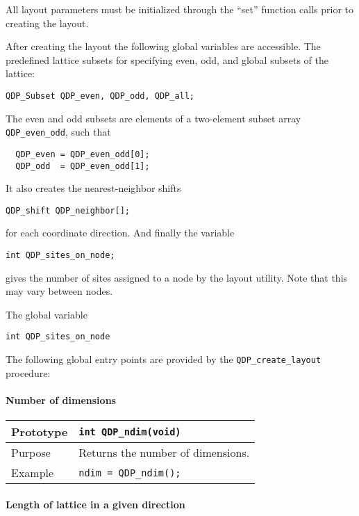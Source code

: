 \documentclass{article}
\begin{document}
All layout parameters must be initialized through the ``set'' function
calls prior to creating the layout.

After creating the layout the following global variables are accessible.
The predefined lattice subsets for specifying even, odd, and
global subsets of the lattice:

\begin{verbatim}
QDP_Subset QDP_even, QDP_odd, QDP_all;
\end{verbatim}
%
The even and odd subsets are elements of a two-element subset array
\verb|QDP_even_odd|, such that
\begin{verbatim}
  QDP_even = QDP_even_odd[0];
  QDP_odd  = QDP_even_odd[1];
\end{verbatim}
%
It also creates the nearest-neighbor shifts 
%
\begin{verbatim}
QDP_shift QDP_neighbor[];
\end{verbatim}
%
for each coordinate direction.  
And finally the variable
%
\begin{verbatim}
int QDP_sites_on_node;
\end{verbatim}
%
gives the number of sites assigned to a node by the layout utility.
Note that this may vary between nodes.

The global variable
\begin{flushleft}
  \verb|int QDP_sites_on_node|
\end{flushleft}


The following global entry points are provided by the
\verb|QDP_create_layout| procedure:

\paragraph{Number of dimensions}

\begin{flushleft}
  \begin{tabular}{|l|l|}
  \hline
  Prototype      & \verb|int QDP_ndim(void)|\\
    \hline
  Purpose        & Returns the number of dimensions. \\
\hline
  Example  & \verb|ndim = QDP_ndim();| \\
   \hline
 \end{tabular}
\end{flushleft}

\paragraph{Length of lattice in a given direction}
\end{document}
